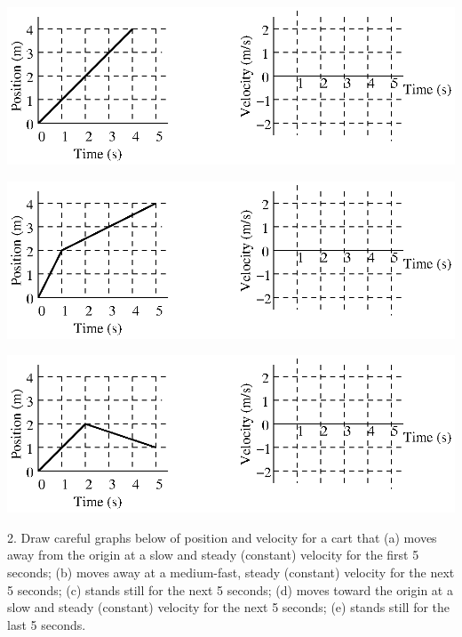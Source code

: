 \vspace{0.3cm}
{\par\centering \includegraphics{relating/relating_fig3.eps} \par}
\vspace{0.3cm}

\vspace{0.3cm}
{\par\centering \includegraphics{relating/relating_fig4.eps} \par}
\vspace{0.3cm}

\vspace{0.3cm}
{\par\centering \includegraphics{relating/relating_fig5.eps} \par}
\vspace{0.3cm}

2. Draw careful graphs below of position and velocity for a cart that (a) moves
away from the origin at a slow and steady (constant) velocity for the first
5 seconds; (b) moves away at a medium-fast, steady (constant) velocity for the
next 5 seconds; (c) stands still for the next 5 seconds; (d) moves toward the
origin at a slow and steady (constant) velocity for the next 5 seconds; (e)
stands still for the last 5 seconds.

